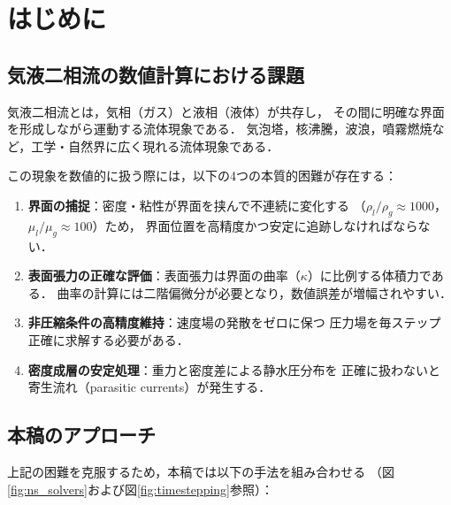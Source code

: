 \documentclass[12pt, a4paper, titlepage]{article}
\newcommand{\jp}[1]{{\normalfont\jpfont #1}}
\begin{document}
\tableofcontents
\newpage

\section{\jp{はじめに}}
\label{sec:intro}

\subsection{\jp{気液二相流の数値計算における課題}}

\jp{気液二相流とは，気相（ガス）と液相（液体）が共存し，
その間に明確な界面を形成しながら運動する流体現象である．
気泡塔，核沸騰，波浪，噴霧燃焼など，工学・自然界に広く現れる流体現象である．}

\jp{この現象を数値的に扱う際には，以下の4つの本質的困難が存在する：}

\begin{enumerate}
  \item \jp{\textbf{界面の捕捉}：密度・粘性が界面を挟んで不連続に変化する
        （$\rho_l/\rho_g \approx 1000$，$\mu_l/\mu_g \approx 100$）ため，
        界面位置を高精度かつ安定に追跡しなければならない．}
  \item \jp{\textbf{表面張力の正確な評価}：表面張力は界面の曲率（$\kappa$）に比例する体積力である．
        曲率の計算には二階偏微分が必要となり，数値誤差が増幅されやすい．}
  \item \jp{\textbf{非圧縮条件の高精度維持}：速度場の発散をゼロに保つ
        圧力場を毎ステップ正確に求解する必要がある．}
  \item \jp{\textbf{密度成層の安定処理}：重力と密度差による静水圧分布を
        正確に扱わないと寄生流れ（parasitic currents）が発生する．}
\end{enumerate}

\subsection{\jp{本稿のアプローチ}}

\jp{上記の困難を克服するため，本稿では以下の手法を組み合わせる
（図\ref{fig:ns_solvers}および図\ref{fig:timestepping}参照）：}
\end{document}
